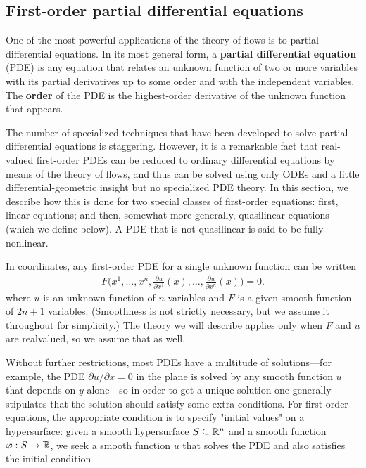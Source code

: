 \subsection{First-order partial differential equations}
One of the most powerful applications of the theory of flows is to partial differential equations. In its most general form, a \textbf{partial differential equation} (PDE) is any equation that relates an unknown function of two or more variables with its partial derivatives up to some order and with the independent variables. The \textbf{order} of the PDE is the highest-order derivative of the unknown function that appears.\par
The number of specialized techniques that have been developed to solve partial differential equations is staggering. However, it is a remarkable fact that real-valued first-order PDEs can be reduced to ordinary differential equations by means of the theory of flows, and thus can be solved using only ODEs and a little differential-geometric insight but no specialized PDE theory. In this section, we describe how this is done for two special classes of first-order equations: first, linear equations; and then, somewhat more generally, quasilinear equations (which we define below). A PDE that is not quasilinear is said to be fully nonlinear.\par
In coordinates, any first-order PDE for a single unknown function can be written
\begin{align}\label{PDE equation}
F\big(x^1,\dots,x^n,\frac{\partial u}{\partial x^1}(x),\dots,\frac{\partial u}{\partial x^n}(x)\big)=0.
\end{align}
where $u$ is an unknown function of $n$ variables and $F$ is a given smooth function of $2n+1$ variables. (Smoothness is not strictly necessary, but we assume it throughout for simplicity.) The theory we will describe applies only when $F$ and $u$ are realvalued, so we assume that as well.\par
Without further restrictions, most PDEs have a multitude of solutions---for example, the PDE $\partial u/\partial x=0$ in the plane is solved by any smooth function $u$ that depends on $y$ alone---so in order to get a unique solution one generally stipulates that the solution should satisfy some extra conditions. For first-order equations, the appropriate condition is to specify "initial values" on a hypersurface: given a smooth hypersurface $S\subseteq\mathbb{R}^n$ and a smooth function $\varphi:S\to\mathbb{R}$, we seek a smooth function $u$ that solves the PDE and also satisfies the initial condition
